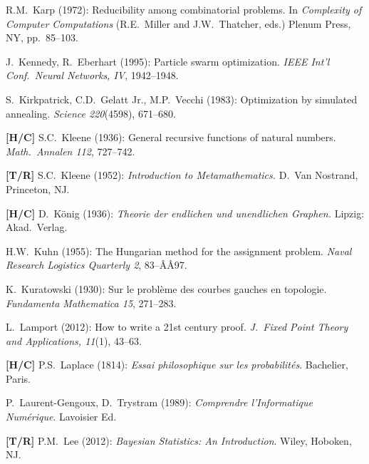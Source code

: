 \begin{thebibliography}{999}
R.M.~Karp (1972): Reducibility among combinatorial problems.  In 
{\it Complexity of Computer Computations} (R.E.~Miller and J.W.~Thatcher, eds.)  Plenum Press, NY, pp.~85--103.

J.~Kennedy, R.~Eberhart (1995): Particle swarm optimization.  {\it IEEE Int'l Conf.~Neural
Networks, IV}, 1942--1948.

S.~Kirkpatrick, C.D.~Gelatt Jr., M.P.~Vecchi (1983):
Optimization by simulated annealing.  {\it Science 220}(4598), 671--680.

{\bf [H/C]}
S.C.~Kleene (1936): General recursive functions of natural numbers.  {\it Math.~Annalen 112}, 727--742.

{\bf [T/R]}
S.C.~Kleene (1952):
{\it Introduction to Metamathematics.}
D.~Van Nostrand, Princeton, NJ.


{\bf [H/C]}
D.~K\"onig (1936): {\it Theorie der endlichen und unendlichen Graphen.}  Lipzig: Akad.~Verlag.

H.W.~Kuhn (1955): The Hungarian method for the assignment problem.  {\it Naval Research Logistics Quarterly 2}, 83--ÂÂ97.

K.~Kuratowski (1930):  Sur le probl\`{e}me des courbes gauches en topologie.
{\it Fundamenta Mathematica 15}, 271--283. 




L.~Lamport (2012): How to write a 21st century proof.
{\it J.~Fixed Point Theory and Applications, 11}(1), 43--63.

{\bf [H/C]}
P.S.~Laplace (1814): {\it Essai philosophique sur les probabilit\'{e}s}.  Bachelier, Paris.

P.~Laurent-Gengoux, D.~Trystram (1989):
{\it Comprendre l'Informatique Num\'{e}rique}.
Lavoisier Ed.

{\bf [T/R]}
P.M.~Lee (2012): {\it Bayesian Statistics: An Introduction}.  Wiley, Hoboken, NJ.


\end{thebibliography}
